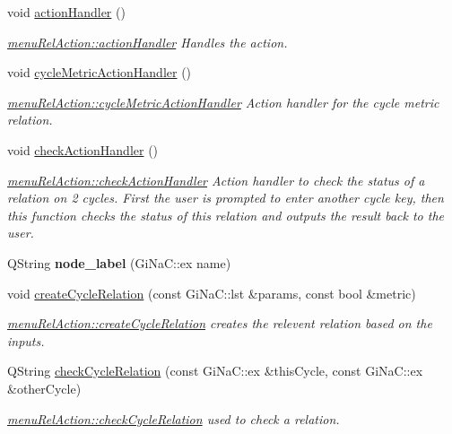 \begin{DoxyCompactItemize}
\item 
void \mbox{\hyperlink{classmenu_rel_action_a23b63e5bdb79e12f74bd1d33a53fb6e0}{action\+Handler}} ()
\begin{DoxyCompactList}\small\item\em \mbox{\hyperlink{classmenu_rel_action_a23b63e5bdb79e12f74bd1d33a53fb6e0}{menu\+Rel\+Action\+::action\+Handler}} Handles the action. \end{DoxyCompactList}\item 
void \mbox{\hyperlink{classmenu_rel_action_adbd43b99466f9ad2cde1934e1599ae4c}{cycle\+Metric\+Action\+Handler}} ()
\begin{DoxyCompactList}\small\item\em \mbox{\hyperlink{classmenu_rel_action_adbd43b99466f9ad2cde1934e1599ae4c}{menu\+Rel\+Action\+::cycle\+Metric\+Action\+Handler}} Action handler for the cycle metric relation. \end{DoxyCompactList}\item 
\mbox{\label{classmenu_rel_action_a1535eb0d2ad06bd4d44f3de8761841b2}} 
void \mbox{\hyperlink{classmenu_rel_action_a1535eb0d2ad06bd4d44f3de8761841b2}{check\+Action\+Handler}} ()
\begin{DoxyCompactList}\small\item\em \mbox{\hyperlink{classmenu_rel_action_a1535eb0d2ad06bd4d44f3de8761841b2}{menu\+Rel\+Action\+::check\+Action\+Handler}} Action handler to check the status of a relation on 2 cycles. First the user is prompted to enter another cycle key, then this function checks the status of this relation and outputs the result back to the user. \end{DoxyCompactList}\item 
\mbox{\label{classmenu_rel_action_a157ae072f7e1622564ff68583bb73132}} 
Q\+String {\bfseries node\+\_\+label} (Gi\+Na\+C\+::ex name)
\item 
void \mbox{\hyperlink{classmenu_rel_action_a64a27674825379ba110fb2117a572ffe}{create\+Cycle\+Relation}} (const Gi\+Na\+C\+::lst \&params, const bool \&metric)
\begin{DoxyCompactList}\small\item\em \mbox{\hyperlink{classmenu_rel_action_a64a27674825379ba110fb2117a572ffe}{menu\+Rel\+Action\+::create\+Cycle\+Relation}} creates the relevent relation based on the inputs. \end{DoxyCompactList}\item 
Q\+String \mbox{\hyperlink{classmenu_rel_action_ab3a724c2d09de8a3d253210ec3a0e0d3}{check\+Cycle\+Relation}} (const Gi\+Na\+C\+::ex \&this\+Cycle, const Gi\+Na\+C\+::ex \&other\+Cycle)
\begin{DoxyCompactList}\small\item\em \mbox{\hyperlink{classmenu_rel_action_ab3a724c2d09de8a3d253210ec3a0e0d3}{menu\+Rel\+Action\+::check\+Cycle\+Relation}} used to check a relation. \end{DoxyCompactList}\end{DoxyCompactItemize}
